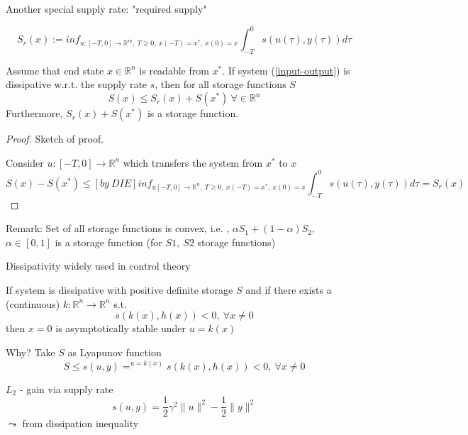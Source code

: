 Another special supply rate: "required supply"

\begin{equation*}
S_r(x) := inf_{u:[-T,0] \to \mathbb{R}^m, \ T \geq 0, \ x(-T) = x^*, \ x(0) = x} \int_{-T}^0 s(u(\tau), y(\tau))d\tau
\end{equation*}

\begin{Theorem}
Assume that end state $x \in \mathbb{R}^n$ is readable from $x^*$. If system (\ref{input-output}) is dissipative w.r.t. the supply rate $s$, then for all storage functions $S$
\begin{equation*}
S(x) \leq S_r(x) + S(x^*) \ \forall \in \mathbb{R}^n
\end{equation*}
Furthermore, $S_r(x) + S(x^*)$ is a storage function.
\begin{proof}
Sketch of proof.

Consider $u:[-T,0] \to \mathbb{R}^n$ which transfers the system from $x^*$ to $x$
\begin{equation*}
S(x) - S(x^*) \leq[by\ DIE] inf_{u[-T,0] \to \mathbb{R}^n, \ T \geq 0, \ x(-T) = x^*, \ x(0) = x} \int_{-T}^0 s(u(\tau), y(\tau))d\tau = S_r(x)
\end{equation*}
\end{proof}
\end{Theorem}

Remark: Set of all storage functions is convex, i.e. , $\alpha S_1 + (1-\alpha) S_2$, $\alpha\in [0,1]$ is a storage function (for $S1, \ S2$ storage functions)

Dissipativity widely used in control theory

If system is dissipative with positive definite storage $S$ and if there exists a (continuous) $k: \mathbb{R}^n \to \mathbb{R}^n$ s.t. 
\begin{equation*}
s(k(x),h(x)) < 0, \ \forall x \neq 0
\end{equation*}
then $x=0$ is asymptotically stable under $u=k(x)$

Why? Take $S$ as Lyapunov function 
\begin{equation*}
\dot{S} \leq s(u,y) =^{u=k(x)} s(k(x),h(x)) < 0, \ \forall x \neq 0
\end{equation*}

$L_2$ - gain via supply rate 
\begin{equation*}
s(u,y) = \frac{1}{2} \gamma^2 \|u\|^2 - \frac{1}{2}\|y\|^2
\end{equation*}
$\leadsto $ from dissipation inequality

